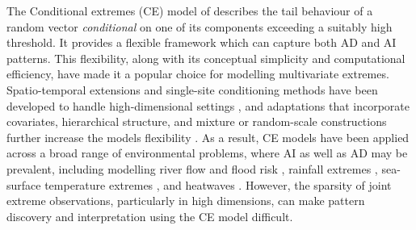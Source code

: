 \documentclass[
  12pt]{article}
\begin{document}

The Conditional extremes (CE) model of \citet{Heffernan2004} describes the tail behaviour of a random vector \emph{conditional} on one of its components exceeding a suitably high threshold.
It provides a flexible framework which can capture both AD and AI patterns. %
This flexibility, along with its conceptual simplicity and computational efficiency, have made it a popular choice for modelling multivariate extremes. 
Spatio-temporal extensions and single-site conditioning methods have been developed to handle high-dimensional settings \citep{Simpson2021, Wadsworth2022}, and adaptations that incorporate covariates, hierarchical structure, and mixture or random-scale constructions further increase the models flexibility \citep{Tawn2018, Richards2023, Tendijck2023}. 
As a result, CE models have been applied across a broad range of environmental problems, where AI as well as AD may be prevalent, including modelling river flow and flood risk \citep{Gilleland2013, Jane2020}, rainfall extremes \citep{Richards2022}, sea-surface temperature extremes \citep{Simpson2023,Kakampakou2024}, and heatwaves \citep{Winter2016}.
However, the sparsity of joint extreme observations, particularly in high dimensions, can make pattern discovery and interpretation using the CE model difficult.
\end{document}
